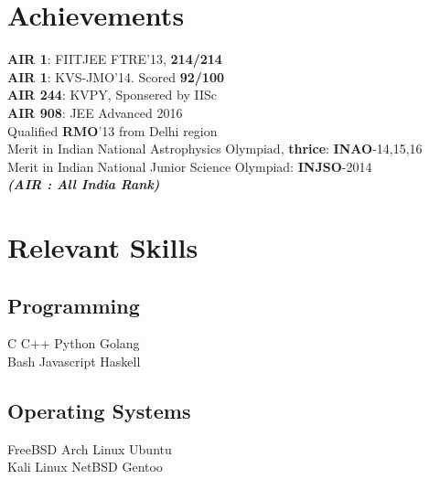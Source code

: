 \documentclass[]{deedy-resume-openfont}
\begin{document}
\begin{minipage}[t]{0.30\textwidth}
\section{Achievements}
\vspace{0.1cm}
\textbf{AIR 1}: FIITJEE FTRE'13, \textbf{214/214}\\
\vspace{0.1cm}
\textbf{AIR 1}: KVS-JMO'14. Scored \textbf{92/100}\\
\vspace{0.1cm}
\textbf{AIR 244}: KVPY, Sponsered by IISc \\
\vspace{0.1cm}
\textbf{AIR 908}: JEE Advanced 2016\\
\vspace{0.1cm}
Qualified \textbf{RMO}'13 from Delhi region\\
\vspace{0.1cm}
Merit in Indian National Astrophysics Olympiad, \textbf{thrice}: \textbf{INAO}-14,15,16 \\
\vspace{0.1cm}
Merit in Indian National Junior Science Olympiad: \textbf{INJSO}-2014 \\

{\footnotesize \textit{\textbf{ (AIR : All India Rank)}}}


\section{Relevant Skills}
\subsection{Programming}
C \textbullet{} C++ \textbullet{} Python \textbullet{} Golang \\
 \vspace{0.1 cm}
Bash \textbullet{} Javascript \textbullet{} Haskell \\
\vspace{0.4 cm}
\subsection{Operating Systems}
FreeBSD \textbullet{} Arch Linux \textbullet{} Ubuntu \\
Kali Linux \textbullet{} NetBSD \textbullet{} Gentoo
\vspace{0.4 cm}

\end{minipage}
\end{document}
